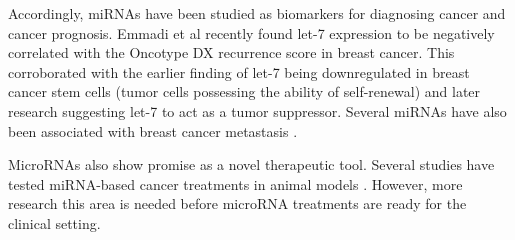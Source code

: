 Accordingly, miRNAs have been studied as biomarkers for diagnosing cancer and
cancer prognosis. Emmadi et al \citep{Emmadi2015} recently found let-7 expression to be negatively
correlated with the Oncotype DX recurrence score in breast cancer.
This corroborated with the earlier finding of let-7 being
downregulated in breast cancer stem cells (tumor cells possessing the ability
of self-renewal) \citep{Yu2007} and later research suggesting let-7 to act as
a tumor suppressor. Several miRNAs have also been associated with breast cancer
metastasis \citep{Chen2016}.

MicroRNAs also show promise as a novel therapeutic tool. Several studies have
tested miRNA-based cancer treatments in animal models \citep{VanRooij2014}.
However, more research this area is needed before microRNA treatments are
ready for the clinical setting.


